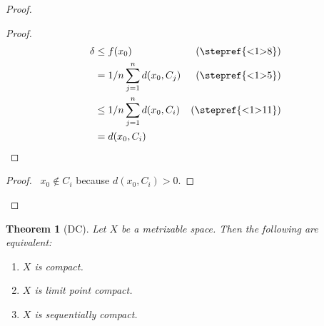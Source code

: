 \documentclass{report}
\let\qed\relax
\newtheorem{thm}[lm]{Theorem}
\theoremstyle{definition}
\begin{document}
\begin{proof}
\begin{proof}
      \pf
      \begin{align*}
        \delta & \leq f(x_0) & (\text{\stepref{<1>8}}) \\
        & = 1/n \sum_{j=1}^n d(x_0, C_j) & (\text{\stepref{<1>5}}) \\
        & \leq 1/n \sum_{j=1}^n d(x_0, C_i) & (\text{\stepref{<1>11}}) \\
        & = d(x_0, C_i)
      \end{align*}
    \end{proof}
    \begin{proof}
      \pf\ $x_0 \notin C_i$ because $d(x_0, C_i) > 0$.
    \end{proof}
    \qed
  \end{proof}


  \begin{thm}[DC]
    Let $X$ be a metrizable space. Then the following are equivalent:
    \begin{enumerate}
      \item $X$ is compact.
      \item $X$ is limit point compact.
      \item $X$ is sequentially compact.
    \end{enumerate}
  \end{thm}
\end{document}
